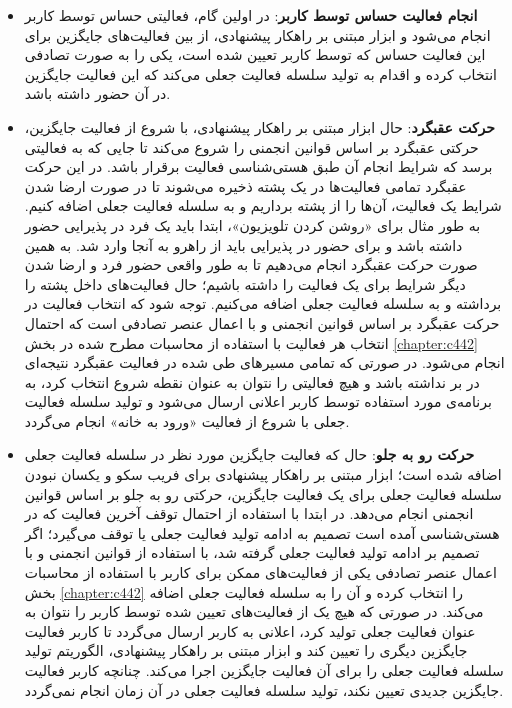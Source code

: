 \begin{itemize}
\item \textbf{انجام فعالیت حساس توسط کاربر}: در اولین گام، فعالیتی حساس توسط کاربر انجام می‌شود و ابزار مبتنی بر راهکار پیشنهادی، از بین فعالیت‌های جایگزین برای این فعالیت حساس که توسط کاربر تعیین شده است، یکی را به صورت تصادفی انتخاب کرده و اقدام به تولید سلسله فعالیت جعلی می‌کند که این فعالیت جایگزین در آن حضور داشته باشد.

\item \textbf{حرکت عقبگرد}: حال ابزار مبتنی بر راهکار پیشنهادی، با شروع از فعالیت جایگزین، حرکتی عقبگرد بر اساس قوانین انجمنی را شروع می‌کند تا جایی که به فعالیتی برسد که شرایط انجام آن طبق هستی‌شناسی فعالیت برقرار باشد. در این حرکت عقبگرد تمامی فعالیت‌ها در یک پشته ذخیره می‌شوند تا در صورت ارضا شدن شرایط یک فعالیت، آن‌ها را از پشته برداریم و به سلسله فعالیت جعلی اضافه کنیم. به طور مثال برای «روشن کردن تلویزیون»، ابتدا باید یک فرد در پذیرایی حضور داشته باشد و برای حضور در پذیرایی باید از راهرو به آنجا وارد شد. به همین صورت حرکت عقبگرد انجام می‌دهیم تا به طور واقعی حضور فرد و ارضا شدن دیگر شرایط برای یک فعالیت را داشته باشیم؛ حال فعالیت‌های داخل پشته را برداشته و به سلسله فعالیت جعلی اضافه می‌کنیم. توجه شود که انتخاب فعالیت در حرکت عقبگرد بر اساس قوانین انجمنی و با اعمال عنصر تصادفی است که احتمال انتخاب هر فعالیت با استفاده از محاسبات مطرح شده در بخش \ref{chapter:c442} انجام می‌شود. در صورتی که تمامی مسیرهای طی شده در فعالیت عقبگرد نتیجه‌ای در بر نداشته باشد و هیچ فعالیتی را نتوان به عنوان نقطه شروع انتخاب کرد، به برنامه‌ی مورد استفاده توسط کاربر اعلانی ارسال می‌شود و تولید سلسله فعالیت جعلی با شروع از فعالیت «ورود به خانه» انجام می‌گردد.

\item \textbf{حرکت رو به جلو}: حال که فعالیت جایگزین مورد نظر در سلسله فعالیت جعلی اضافه شده است؛ ابزار مبتنی بر راهکار پیشنهادی برای فریب سکو و یکسان نبودن سلسله فعالیت جعلی برای یک فعالیت جایگزین، حرکتی رو به جلو بر اساس قوانین انجمنی انجام می‌دهد. در ابتدا با استفاده از احتمال توقف آخرین فعالیت که در هستی‌شناسی آمده است تصمیم به ادامه تولید فعالیت جعلی یا توقف می‌گیرد؛ اگر تصمیم بر ادامه تولید فعالیت جعلی گرفته شد، با استفاده از قوانین انجمنی و با اعمال عنصر تصادفی یکی از فعالیت‌های ممکن برای کاربر با استفاده از محاسبات بخش \ref{chapter:c442} را انتخاب کرده و آن را به سلسله فعالیت جعلی اضافه می‌کند. در صورتی که هیچ یک از فعالیت‌های تعیین شده توسط کاربر را نتوان به عنوان فعالیت جعلی تولید کرد، اعلانی به کاربر ارسال می‌گردد تا کاربر فعالیت جایگزین دیگری را تعیین کند و ابزار مبتنی بر راهکار پیشنهادی، الگوریتم تولید سلسله فعالیت جعلی را برای آن فعالیت جایگزین اجرا می‌کند. چنانچه کاربر فعالیت جایگزین جدیدی تعیین نکند، تولید سلسله فعالیت جعلی در آن زمان انجام نمی‌گردد.


\end{itemize}

